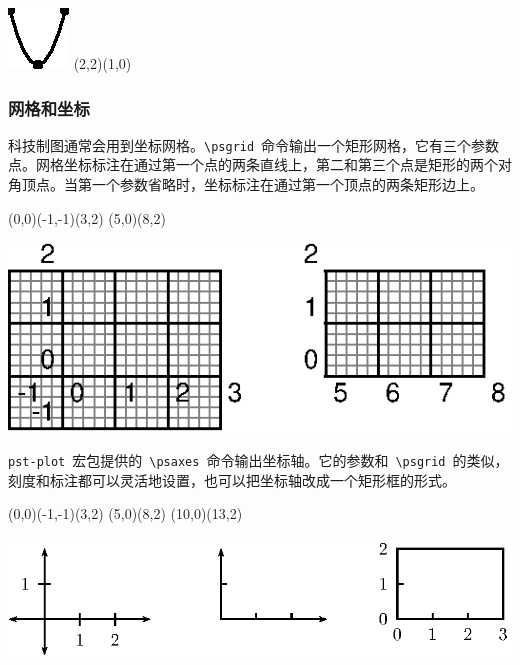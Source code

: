 \begin{fdemo}{\includegraphics{examples/pst_parabola.eps}}
\psparabola[showpoints=true]
    (2,2)(1,0)
\end{fdemo}

\subsubsection{网格和坐标}
科技制图通常会用到坐标网格。\verb|\psgrid|~命令输出一个矩形网格，它有三个参数点。网格坐标标注在通过第一个点的两条直线上，第二和第三个点是矩形的两个对角顶点。当第一个参数省略时，坐标标注在通过第一个顶点的两条矩形边上。

\begin{code}
\psgrid(0,0)(-1,-1)(3,2)
\psgrid(5,0)(8,2)
\end{code}
\begin{out}
\includegraphics{examples/pst_grid.eps}
\end{out}

\verb|pst-plot|~宏包提供的~\verb|\psaxes|~命令输出坐标轴。它的参数和~\verb|\psgrid|~的类似，刻度和标注都可以灵活地设置，也可以把坐标轴改成一个矩形框的形式。
\begin{code}
\psaxes{<->}(0,0)(-1,-1)(3,2)
\psaxes[tickstyle=top,labels=none]{->}(5,0)(8,2)
\psaxes[axesstyle=frame,tickstyle=top]{->}(10,0)(13,2)
\end{code}
\begin{out}
\includegraphics{examples/pst_axis.eps}
\end{out}

